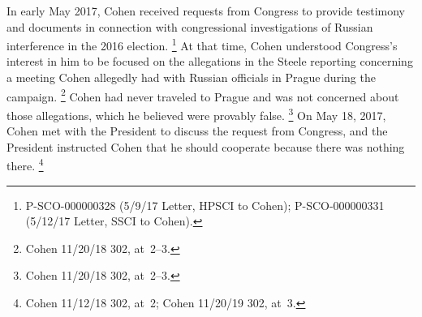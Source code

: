 {In early May 2017, Cohen received requests from Congress to provide testimony and documents in connection with congressional investigations of Russian interference in the 2016 election.%
\footnote{P-SCO-000000328 (5/9/17 Letter, HPSCI to Cohen);
P-SCO-000000331 (5/12/17 Letter, SSCI to Cohen).}
At that time, Cohen understood Congress's interest in him to be focused on the allegations in the Steele reporting concerning a meeting Cohen allegedly had with Russian officials in Prague during the campaign.%
\footnote{Cohen 11/20/18 302, at~2--3.}
Cohen had never traveled to Prague and was not concerned about those allegations, which he believed were provably false.%
\footnote{Cohen 11/20/18 302, at~2--3.}
On May 18, 2017, Cohen met with the President to discuss the request from Congress, and the President instructed Cohen that he should cooperate because there was nothing there.%
\footnote{Cohen 11/12/18 302, at~2;
Cohen 11/20/19 302, at~3.}

}
